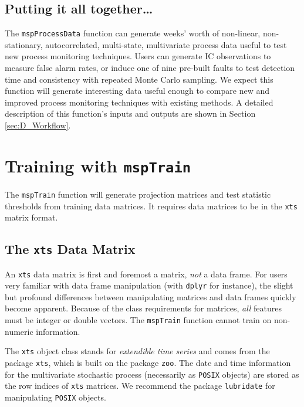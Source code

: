 \documentclass{report}\usepackage[]{graphicx}\usepackage[]{color}
\begin{document}
\subsection{Putting it all together\ldots}
The \texttt{mspProcessData} function can generate weeks' worth of non-linear, non-stationary, autocorrelated, multi-state, multivariate process data useful to test new process monitoring techniques. Users can generate IC observations to measure false alarm rates, or induce one of nine pre-built faults to test detection time and consistency with repeated Monte Carlo sampling. We expect this function will generate interesting data useful enough to compare new and improved process monitoring techniques with existing methods. A detailed description of this function's inputs and outputs are shown in Section \ref{sec:D_Workflow}.




\section{Training with \texttt{mspTrain}} \label{sec:D_Train}

The \texttt{mspTrain} function will generate projection matrices and test statistic thresholds from training data matrices. It requires data matrices to be in the \texttt{xts} matrix format.


\subsection{The \texttt{xts} Data Matrix}
An \texttt{xts} data matrix is first and foremost a matrix, \emph{not} a data frame. For users very familiar with data frame manipulation (with \texttt{dplyr} for instance), the slight but profound differences between manipulating matrices and data frames quickly become apparent. Because of the class requirements for matrices, \emph{all} features must be integer or double vectors. The \texttt{mspTrain} function cannot train on non-numeric information.

The \texttt{xts} object class stands for \emph{extendible time series} and comes from the package \texttt{xts}, which is built on the package \texttt{zoo}. The date and time information for the multivariate stochastic process (necessarily as \texttt{POSIX} objects) are stored as the row indices of \texttt{xts} matrices. We recommend the package \texttt{lubridate} for manipulating \texttt{POSIX} objects.
\end{document}
